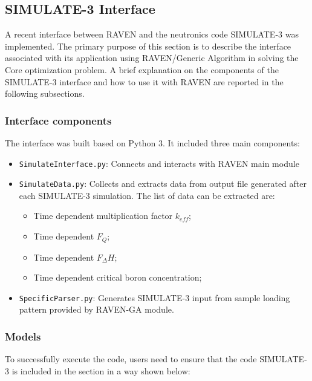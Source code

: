 \subsection{SIMULATE-3 Interface}
A recent interface between RAVEN and the neutronics code SIMULATE-3 was implemented.
The primary purpose of this section is to describe the interface associated 
with its application using RAVEN/Generic Algorithm in solving the Core optimization problem.
A brief explanation on the components of the SIMULATE-3 interface and how to use it with RAVEN 
are reported in the following subsections.

\subsubsection{Interface components}
The interface was built based on Python 3. It included three main components: 
\begin{itemize}

	\item \texttt{SimulateInterface.py}: Connects and interacts with RAVEN main module
	\item \texttt{SimulateData.py}: Collects and extracts data from output file generated after each SIMULATE-3 simulation. The list of data can be extracted are:
	\begin{itemize}
  \item Time dependent multiplication factor $k_{eff}$;
	\item Time dependent $F_Q$;
	\item Time dependent $F_\Delta H$;
	\item Time dependent critical boron concentration;
  \end{itemize}
  \item \texttt{SpecificParser.py}: Generates SIMULATE-3 input from sample loading pattern provided by RAVEN-GA module. 
\end{itemize}

\subsubsection{Models}
To successfully execute the code, users need to ensure that the code SIMULATE-3 is included in the 
 section in a way shown below:

